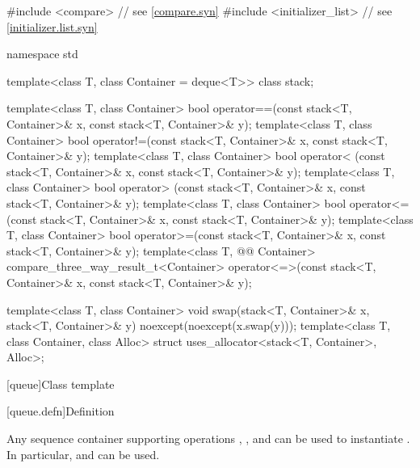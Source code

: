 %
\begin{codeblock}
#include <compare>              // see \ref{compare.syn}
#include <initializer_list>     // see \ref{initializer.list.syn}

namespace std {
  template<class T, class Container = deque<T>> class stack;

  template<class T, class Container>
    bool operator==(const stack<T, Container>& x, const stack<T, Container>& y);
  template<class T, class Container>
    bool operator!=(const stack<T, Container>& x, const stack<T, Container>& y);
  template<class T, class Container>
    bool operator< (const stack<T, Container>& x, const stack<T, Container>& y);
  template<class T, class Container>
    bool operator> (const stack<T, Container>& x, const stack<T, Container>& y);
  template<class T, class Container>
    bool operator<=(const stack<T, Container>& x, const stack<T, Container>& y);
  template<class T, class Container>
    bool operator>=(const stack<T, Container>& x, const stack<T, Container>& y);
  template<class T, @@ Container>
    compare_three_way_result_t<Container>
      operator<=>(const stack<T, Container>& x, const stack<T, Container>& y);

  template<class T, class Container>
    void swap(stack<T, Container>& x, stack<T, Container>& y) noexcept(noexcept(x.swap(y)));
  template<class T, class Container, class Alloc>
    struct uses_allocator<stack<T, Container>, Alloc>;
}
\end{codeblock}

[queue]{Class template }

[queue.defn]{Definition}

\pnum
{}%
Any sequence container supporting operations
,
,
and
can be used to instantiate
.
In particular,
and
can be used.

